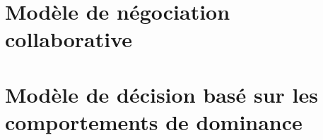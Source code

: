 \documentclass[a4paper, 11pt]{book}
\begin{document}
	
%	
	\chapter{Modèle de négociation collaborative}
		\minitoc
%		
	
%	
	\chapter{Modèle de décision basé sur les comportements de dominance}
	\minitoc
	

%
%	
%
%		

	
	
\end{document}
